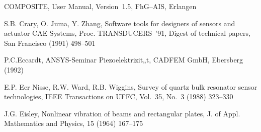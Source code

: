 \begin{thebibliography}{xxx}
 {\sf COMPOSITE}, User Manual, Version~1.5, FhG--AIS, Erlangen

 S.B. Crary, O. Juma, Y. Zhang, Software tools for designers of sensors and
 actuator CAE Systems, Proc. TRANSDUCERS~'91, Digest of technical papers,
 San Francisco (1991) 498--501








 P.C.Eccardt, {\sf ANSYS}\--Seminar Piezo\-elek\-tri\-zi\-t„t,
 CAD\-FEM GmbH, Ebers\-berg (1992)

 E.P. Eer Nisse, R.W. Ward, R.B. Wiggins, Survey of quartz bulk resonator
 sensor technologies, IEEE Transactions on UFFC, Vol.~35, No.~3
 (1988) 323--330

 J.G. Eisley, Nonlinear vibration of beams and rectangular plates,
 J. of Appl. Mathematics and Physics, 15 (1964) 167--175



\end{thebibliography}
